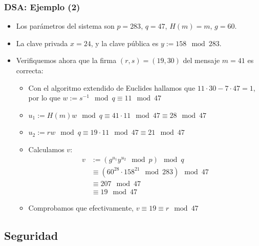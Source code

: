 \documentclass{beamer}
\begin{document}
\begin{frame}
    \frametitle{DSA: Ejemplo (2)}
    
    \begin{itemize}
        \item Los parámetros del sistema son $p = 283$, $q = 47$, $H(m) = m$, $g = 60$.
        \item La clave privada $x = 24$, y la clave pública es $y := 158 \mod 283$.
        \item Verifiquemos ahora que la firma $(r, s) = (19, 30)$ del mensaje $m=41$ es correcta:
        \begin{itemize}
            \item Con el algoritmo extendido de Euclides hallamos que $11 \cdot 30 -7 \cdot 47 = 1$, por lo que $w := s^{-1} \mod q \equiv 11 \mod 47$
            \item $u_1 := H(m) w \mod q \equiv 41 \cdot 11 \mod 47 \equiv 28 \mod 47 $
            \item $u_2 := r w \mod q \equiv 19 \cdot 11 \mod 47 \equiv 21 \mod 47 $
            
            \item Calculamos $v$:
            \begin{align*}
                v & := \left(g^{u_1} y^{u_2} \mod p \right) \mod q \\ 
                & \equiv \left(60^{28} \cdot 158^{21} \mod 283 \right) \mod 47 \\
                & \equiv 207 \mod 47 \\
                & \equiv 19 \mod 47
            \end{align*}
            \item Comprobamos que efectivamente, $v \equiv 19 \equiv r \mod 47$
        \end{itemize}
    \end{itemize}
\end{frame}

\subsection{Seguridad}
\end{document}
